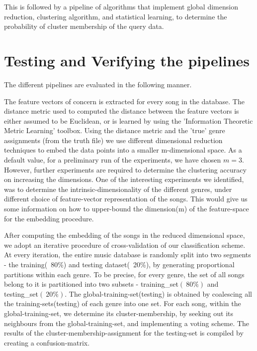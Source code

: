 \documentclass[12pt]{article}
\begin{document}
This is followed by a pipeline of algorithms that implement global dimension reduction, clustering algorithm, and statistical learning, to determine the probability of cluster membership of the query data. 

\section{Testing and Verifying the pipelines}

The different pipelines are evaluated in the following manner. 

The feature vectors of concern is extracted for every song in the database. The distance metric used to computed the distance between the feature vectors is either assumed to be Euclidean, or is learned by using the 'Information Theoretic Metric Learning' \cite{infoTheoryMetricLearning} toolbox. Using the distance metric and the 'true' genre assignments (from the truth file) we use different dimensional reduction techniques to embed the data points into a smaller m-dimensional space. As a default value, for a preliminary run of the experiments, we have chosen $m = 3$. However, further experiments are required to determine the clustering accuracy on increasing the dimensions. One of the interesting experiments we identified, was to determine the intrinsic-dimensionality of the different genres, under different choice of feature-vector representation of the songs. This would give us some information on how to upper-bound the dimension(m) of the feature-space for the embedding procedure.

After computing the embedding of the songs in the reduced dimensional space, we adopt an iterative procedure of cross-validation of our classification scheme. At every iteration, the entire music database is randomly split into two segments - the training(~80\%) and testing dataset(~20\%), by generating proportional partitions within each genre.
To be precise, for every genre, the set of all songs belong to it is partitioned into two subsets - training_set$(~80\%)$ and testing_set$(~20\%)$. The global-training-set(testing) is obtained by coalescing all the training-sets(testing) of each genre into one set. For each song, within the global-training-set, we determine its cluster-membership, by seeking out its neighbours from the global-training-set, and implementing a voting scheme. The results of the cluster-membership-assignment for the testing-set is compiled by creating a confusion-matrix. 
\end{document}
